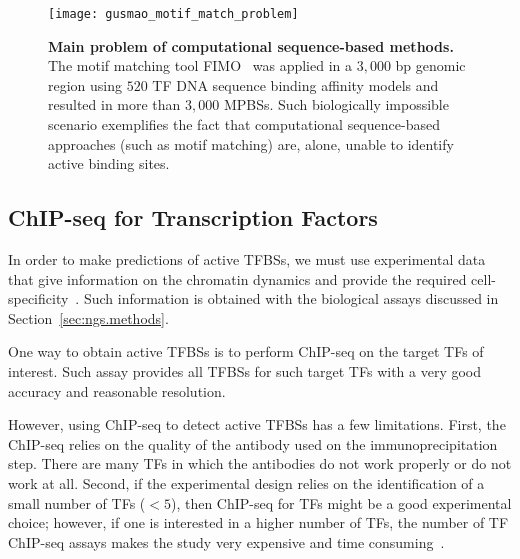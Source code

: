 \begin{figure}[h!]
\centering
\texttt{[image: gusmao\_motif\_match\_problem]}
\caption[Main problem of computational sequence-based methods]{\textbf{Main problem of computational sequence-based methods.} The motif matching tool FIMO~\citep{grant2011} was applied in a $3,000$ bp genomic region using $520$ TF DNA sequence binding affinity models and resulted in more than $3,000$ MPBSs. Such biologically impossible scenario exemplifies the fact that computational sequence-based approaches (such as motif matching) are, alone, unable to identify active binding sites.}
\label{fig:gusmao_motif_match_problem}
\end{figure}

\subsection{ChIP-seq for Transcription Factors}
\label{sec:chipseq.tf}

In order to make predictions of active TFBSs, we must use experimental data that give information on the chromatin dynamics and provide the required cell-specificity~\citep{arvey2012,thurman2012}. Such information is obtained with the biological assays discussed in Section~\ref{sec:ngs.methods}. 

One way to obtain active TFBSs is to perform ChIP-seq on the target TFs of interest. Such assay provides all TFBSs for such target TFs with a very good accuracy and reasonable resolution.

However, using ChIP-seq to detect active TFBSs has a few limitations. First, the ChIP-seq relies on the quality of the antibody used on the immunoprecipitation step. There are many TFs in which the antibodies do not work properly or do not work at all. Second, if the experimental design relies on the identification of a small number of TFs ($<5$), then ChIP-seq for TFs might be a good experimental choice; however, if one is interested in a higher number of TFs, the number of TF ChIP-seq assays makes the study very expensive and time consuming~\citep{boyle2011,pique2011}.

